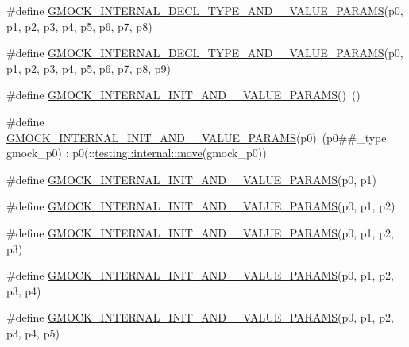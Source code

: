 \begin{DoxyCompactItemize}
\item 
\#define \mbox{\hyperlink{gmock-generated-actions_8h_a27e84307ea95be9e2e4526cd6b34a151}{G\+M\+O\+C\+K\+\_\+\+I\+N\+T\+E\+R\+N\+A\+L\+\_\+\+D\+E\+C\+L\+\_\+\+T\+Y\+P\+E\+\_\+\+A\+N\+D\+\_\+\_\+\+V\+A\+L\+U\+E\+\_\+\+P\+A\+R\+A\+MS}}(p0,  p1,  p2,  p3,  p4,  p5,  p6,  p7,  p8)
\item 
\#define \mbox{\hyperlink{gmock-generated-actions_8h_a791e16a318652e43abb3c1aeba969d4d}{G\+M\+O\+C\+K\+\_\+\+I\+N\+T\+E\+R\+N\+A\+L\+\_\+\+D\+E\+C\+L\+\_\+\+T\+Y\+P\+E\+\_\+\+A\+N\+D\+\_\+\_\+\+V\+A\+L\+U\+E\+\_\+\+P\+A\+R\+A\+MS}}(p0,  p1,  p2,  p3,  p4,  p5,  p6,  p7,  p8,  p9)
\item 
\#define \mbox{\hyperlink{gmock-generated-actions_8h_aea5ee581daf40874ee7777e3c2b6d4ff}{G\+M\+O\+C\+K\+\_\+\+I\+N\+T\+E\+R\+N\+A\+L\+\_\+\+I\+N\+I\+T\+\_\+\+A\+N\+D\+\_\+\_\+\+V\+A\+L\+U\+E\+\_\+\+P\+A\+R\+A\+MS}}()~()
\item 
\#define \mbox{\hyperlink{gmock-generated-actions_8h_ad9d6ae16782bf5b8ffa096356f20b5ef}{G\+M\+O\+C\+K\+\_\+\+I\+N\+T\+E\+R\+N\+A\+L\+\_\+\+I\+N\+I\+T\+\_\+\+A\+N\+D\+\_\+\_\+\+V\+A\+L\+U\+E\+\_\+\+P\+A\+R\+A\+MS}}(p0)~(p0\#\#\+\_\+type gmock\+\_\+p0) \+: p0(\+::\mbox{\hyperlink{namespacetesting_1_1internal_a0f6d06bf8c3093b9c22bb08723db201e}{testing\+::internal\+::move}}(gmock\+\_\+p0))
\item 
\#define \mbox{\hyperlink{gmock-generated-actions_8h_af8fc781d28282b09de4b5bda9563cded}{G\+M\+O\+C\+K\+\_\+\+I\+N\+T\+E\+R\+N\+A\+L\+\_\+\+I\+N\+I\+T\+\_\+\+A\+N\+D\+\_\+\_\+\+V\+A\+L\+U\+E\+\_\+\+P\+A\+R\+A\+MS}}(p0,  p1)
\item 
\#define \mbox{\hyperlink{gmock-generated-actions_8h_ab452cc97981b64f68df83aedc023a201}{G\+M\+O\+C\+K\+\_\+\+I\+N\+T\+E\+R\+N\+A\+L\+\_\+\+I\+N\+I\+T\+\_\+\+A\+N\+D\+\_\+\_\+\+V\+A\+L\+U\+E\+\_\+\+P\+A\+R\+A\+MS}}(p0,  p1,  p2)
\item 
\#define \mbox{\hyperlink{gmock-generated-actions_8h_a9749c8366b3617ee3d14f4f4e9ae18ae}{G\+M\+O\+C\+K\+\_\+\+I\+N\+T\+E\+R\+N\+A\+L\+\_\+\+I\+N\+I\+T\+\_\+\+A\+N\+D\+\_\+\_\+\+V\+A\+L\+U\+E\+\_\+\+P\+A\+R\+A\+MS}}(p0,  p1,  p2,  p3)
\item 
\#define \mbox{\hyperlink{gmock-generated-actions_8h_ab3c77cabbb94ae2e3a4f9fdbda784731}{G\+M\+O\+C\+K\+\_\+\+I\+N\+T\+E\+R\+N\+A\+L\+\_\+\+I\+N\+I\+T\+\_\+\+A\+N\+D\+\_\+\_\+\+V\+A\+L\+U\+E\+\_\+\+P\+A\+R\+A\+MS}}(p0,  p1,  p2,  p3,  p4)
\item 
\#define \mbox{\hyperlink{gmock-generated-actions_8h_aef68add35463c75130872b22d07c43ff}{G\+M\+O\+C\+K\+\_\+\+I\+N\+T\+E\+R\+N\+A\+L\+\_\+\+I\+N\+I\+T\+\_\+\+A\+N\+D\+\_\+\_\+\+V\+A\+L\+U\+E\+\_\+\+P\+A\+R\+A\+MS}}(p0,  p1,  p2,  p3,  p4,  p5)

\end{DoxyCompactItemize}
